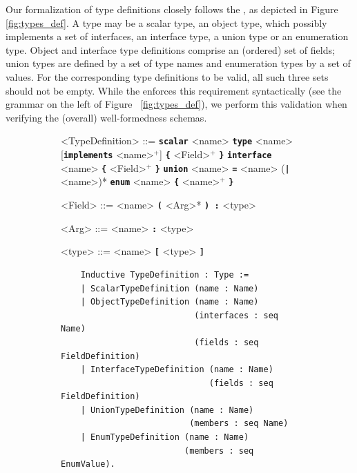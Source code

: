 Our formalization of type definitions closely follows the \spec, as depicted in Figure~ \ref{fig:types_def}. A type may be a scalar type, an object type, which possibly implements a set of interfaces, an interface type, a union type or an enumeration type. Object and interface type definitions comprise an (ordered) set of fields; union types are defined by a set of type names and enumeration types by a set of values. For the corresponding type definitions to be valid, all such three sets should not be empty. While the \spec enforces this requirement syntactically (see the grammar on the left of Figure~ \ref{fig:types_def}), we perform this validation when verifying the (overall) well-formedness schemas.     
%
\setlength{\grammarparsep}{10pt plus 1pt minus 1pt} %
\begin{figure}[h]
    \centering
    \begin{subfigure}{.5\textwidth}
    \begin{grammar}
    <TypeDefinition> ::= \textbf{\texttt{scalar}} <name>
    \alt \textbf{\texttt{type}} <name> [\textbf{\texttt{implements}} <name>$^{+}$] \textbf{\texttt{\{}} <Field>$^{+}$ \textbf{\texttt{\}}}
    \alt \textbf{\texttt{interface}} <name> \textbf{\texttt{\{}} <Field>$^{+}$ \textbf{\texttt{\}}}
    \alt \textbf{\texttt{union}} <name> \textbf{\texttt{=}} <name> (\textbf{\texttt{|}} <name>)*
    \alt \textbf{\texttt{enum}} <name>  \textbf{\texttt{\{}}  <name>$^{+}$ \textbf{\texttt{\}}}

    <Field> ::= <name> \textbf{\texttt{(}} <Arg>* \textbf{\texttt{) :}} <type>

    <Arg> ::= <name> \textbf{\texttt{:}} <type>

    <type> ::= <name>
    \alt \textbf{\texttt{[}}  <type> \textbf{\texttt{]}}
    \end{grammar}

    \end{subfigure}%
    \begin{subfigure}{.5\textwidth}
    \begin{verbatim}
    Inductive TypeDefinition : Type :=
    | ScalarTypeDefinition (name : Name)
    | ObjectTypeDefinition (name : Name)
                           (interfaces : seq Name)
                           (fields : seq FieldDefinition)
    | InterfaceTypeDefinition (name : Name)
                              (fields : seq FieldDefinition)
    | UnionTypeDefinition (name : Name)
                          (members : seq Name)
    | EnumTypeDefinition (name : Name)
                         (members : seq EnumValue).


\end{verbatim}
\end{subfigure}
\end{figure}
